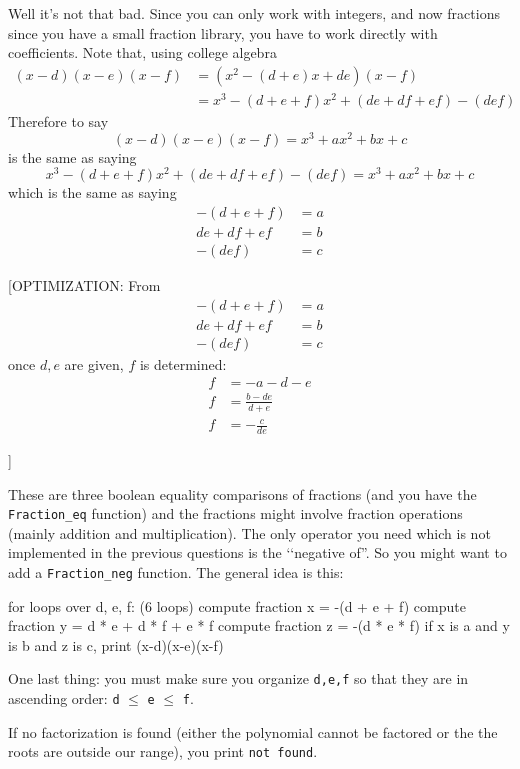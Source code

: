 Well it's not that bad.
Since you can only work with integers, and now fractions since you have a small fraction
library, you have to work directly with coefficients.
Note that, using college algebra
\begin{align*}
  (x-d)(x-e)(x-f)
  &= (x^2 - (d + e) x + de)(x - f) \\
  &= x^3 - (d + e + f) x^2 + (de + df + ef) - (def)
\end{align*}
Therefore to say
\[
  (x-d)(x-e)(x-f) = x^3 + ax^2 + bx + c
\]
is the same as saying
\[
  x^3 - (d + e + f) x^2 + (de + df + ef) - (def) = x^3 + ax^2 + bx + c
\]
which is the same as saying
\begin{align*}
  -(d + e + f) &= a \\
  de + df + ef &= b \\
  - (def) &=  c
\end{align*}

[OPTIMIZATION:
From
\begin{align*}
  -(d + e + f) &= a \\
  de + df + ef &= b \\
  - (def) &=  c
\end{align*}
once $d,e$ are given, $f$ is determined:
\begin{align*}
  f &= -a - d - e\\
  f &= \frac{b - de}{d + e}\\
  f &=  -\frac{c}{de}
\end{align*}

]

These are three boolean equality comparisons of fractions (and you have the \verb!Fraction_eq! function)
and the fractions might involve fraction operations (mainly addition and multiplication).
The only operator you need which is not implemented in the previous questions is the
\lq\lq negative of''.
So you might want to add a \verb!Fraction_neg! function.
The general idea is this:
\begin{console}
for loops over d, e, f: (6 loops)
         compute fraction x = -(d + e + f)
         compute fraction y = d * e + d * f + e * f
         compute fraction z = -(d * e * f)
         if x is a and y is b and z is c,
             print (x-d)(x-e)(x-f)
\end{console}
One last thing: you must make sure you organize \verb!d,e,f! so that they are in ascending order:
\verb!d!
$\leq$
\verb!e!
$\leq$
\verb!f!.

If no factorization is found (either the polynomial cannot be factored or the
the roots are outside our range), you print \verb!not found!.


